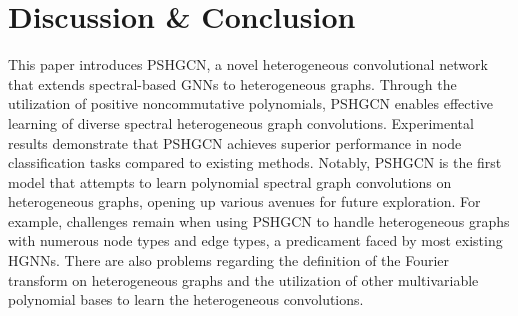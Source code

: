 \documentclass{article}
\begin{document}
\begin{table}[t]
\centering
\small
\caption{Node classification performance comparison of PSHGCN and its variant on four datasets.}
\vspace{-4mm}
\label{tb:ab_res}
\end{table}



\section{Discussion \& Conclusion}
This paper introduces PSHGCN, a novel heterogeneous convolutional network that extends spectral-based GNNs to heterogeneous graphs. Through the utilization of positive noncommutative polynomials, PSHGCN enables effective learning of diverse spectral heterogeneous graph convolutions. Experimental results demonstrate that PSHGCN achieves superior performance in node classification tasks compared to existing methods. Notably, PSHGCN is the first model that attempts to learn polynomial spectral graph convolutions on heterogeneous graphs, opening up various avenues for future exploration. For example, challenges remain when using PSHGCN to handle heterogeneous graphs with numerous node types and edge types, a predicament faced by most existing HGNNs. There are also problems regarding the definition of the Fourier transform on heterogeneous graphs and the utilization of other multivariable polynomial bases to learn the heterogeneous convolutions. 



\newpage
\clearpage


\end{document}
